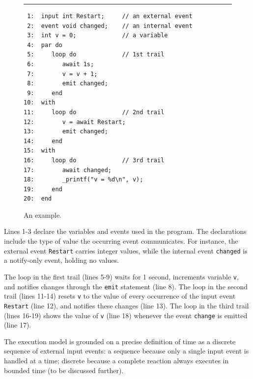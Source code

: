\documentclass[pdftex,12pt,a4paper]{article}
\newcommand{\code}[1] {{\small{\texttt{#1}}}}
\begin{document}
\begin{figure}[t]
\rule{8.5cm}{0.37pt}
{\small
\begin{verbatim}
 1:  input int Restart;     // an external event
 2:  event void changed;    // an internal event
 3:  int v = 0;             // a variable
 4:  par do
 5:     loop do             // 1st trail
 6:        await 1s;
 7:        v = v + 1;
 8:        emit changed;
 9:     end
10:  with
11:     loop do             // 2nd trail
12:        v = await Restart;
13:        emit changed;
14:     end
15:  with
16:     loop do             // 3rd trail
17:        await changed;
18:        _printf("v = %d\n", v);
19:     end
20:  end
\end{verbatim}
}
\caption{ An example.
\label{lst:ceu:1}
}
\end{figure}

Lines 1-3 declare the variables and events used in the program.
The declarations include the type of value the occurring event communicates.
For instance, the external event \code{Restart} carries integer values, while 
the internal event \code{changed} is a notify-only event, holding no values.

The loop in the first trail (lines 5-9) waits for 1 second, increments variable 
\code{v}, and notifies changes through the \code{emit} statement (line 8).
The loop in the second trail (lines 11-14) resets \code{v} to the value of 
every occurrence of the input event \code{Restart} (line 12), and notifies 
these changes (line 13).
The loop in the third trail (lines 16-19) shows the value of \code{v} (line 18) 
whenever the event \code{change} is emitted (line 17).

The execution model is grounded on a precise definition of time as a discrete 
sequence of external input events:
a sequence because only a single input event is handled at a time; discrete 
because a complete reaction always executes in bounded time (to be discussed 
further).
\end{document}

